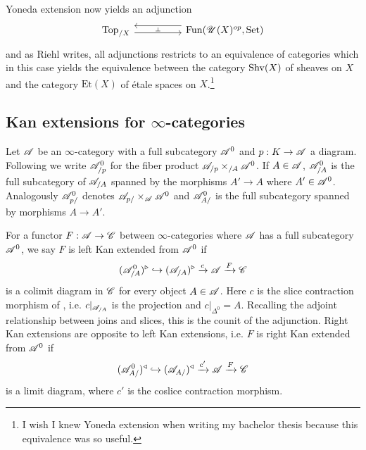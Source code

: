 \documentclass[../../thesis.tex]{subfiles}
\begin{document}
Yoneda extension now yields an adjunction
\[\begin{tikzcd}
        {\mathrm{Top}_{/X}} && {\Fun(\Open(X)^{op},\SET)}
        \arrow[""{name=0, anchor=center, inner sep=0}, shift right=1, from=1-1, to=1-3]
        \arrow[""{name=1, anchor=center, inner sep=0}, shift right=2, from=1-3, to=1-1]
        \arrow["\dashv"{anchor=center, rotate=-90}, draw=none, from=1, to=0]
    \end{tikzcd}\]
and as Riehl writes, all adjunctions restricts to an equivalence of categories which in this case yields the equivalence between the category $\mathrm{Shv}(X)$ of sheaves on $X$ and the category $\mathrm{Et}(X)$ of étale spaces on $X$.\footnote{I wish I knew Yoneda extension when writing my bachelor thesis because this equivalence was so useful.}
\subsection{Kan extensions for $\infty$-categories}
\begin{definition}
    Let $\mathscr{A}$ be an $\infty$-category with a full subcategory $\mathscr{A}^0$ and $p:K\to \mathscr{A}$ a diagram.
    Following \cite[Notation 4.3.2.1]{HTT} we write $\mathscr{A}^0_{/p}$ for the fiber product $\mathscr{A}_{/p}\times_{/A}\mathscr{A}^0$.
    If $A\in \mathscr{A}$, $\mathscr{A}^0_{/A}$ is the full subcategory of $\mathscr{A}_{/A}$ spanned by the morphisms $A'\to A$ where $A'\in \mathscr{A}^0$.
    \newline
    Analogously $\mathscr{A}^0_{p/}$ denotes $\mathscr{A}_{p/}\times_{\mathscr{A}}\mathscr{A}^0$ and $\mathscr{A}^0_{A/}$ is the full subcategory spanned by morphisms $A\to A'$.
\end{definition}
\begin{definition}\label{KanDef}
    For a functor $F: \mathscr{A} \to \mathscr{C}$ between $\infty$-categories where $\mathscr{A}$ has a full subcategory $\mathscr{A}^0$, we say $F$ is left Kan extended from $\mathscr{A}^{0}$ if
    \[
        (\mathscr{A}^{0}_{/A})^{\triangleright} \hookrightarrow (\mathscr{A}_{/A})^{\triangleright} \xrightarrow{c} \mathscr{A} \xrightarrow{F}\mathscr{C}
    \]
    is a colimit diagram in $\mathscr{C}$ for every object $A\in \mathscr{A}$.
    Here $c$ is the slice contraction morphism of \cite[\href{https://kerodon.net/tag/0188}{Tag 0188}]{kerodon}, i.e.
    $c|_{\mathscr{A}_{/A}}$ is the projection and $c|_{\Delta^0}=A$.
    Recalling the adjoint relationship between joins and slices, this is the counit of the adjunction.
    \newline
    Right Kan extensions are opposite to left Kan extensions, i.e. $F$ is right Kan extended from $\mathscr{A}^0$ if
    \[
        (\mathscr{A}^{0}_{A/})^{\triangleleft} \hookrightarrow (\mathscr{A}_{A/})^{\triangleleft} \xrightarrow{c'} \mathscr{A} \xrightarrow{F}\mathscr{C}
    \]
    is a limit diagram, where $c'$ is the coslice contraction morphism.
\end{definition}
\end{document}
